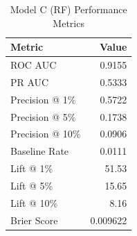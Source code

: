 \begin{table}[h]
\centering
\begin{tabular}{lr}
\toprule
Metric & Value \\
\midrule
ROC AUC & 0.9155 \\
PR AUC & 0.5333 \\
Precision @ 1\% & 0.5722 \\
Precision @ 5\% & 0.1738 \\
Precision @ 10\% & 0.0906 \\
Baseline Rate & 0.0111 \\
Lift @ 1\% & 51.53 \\
Lift @ 5\% & 15.65 \\
Lift @ 10\% & 8.16 \\
Brier Score & 0.009622 \\
\bottomrule
\end{tabular}
\caption{Model C (RF) Performance Metrics}
\label{tab:modelc_rf_metrics}
\end{table}
